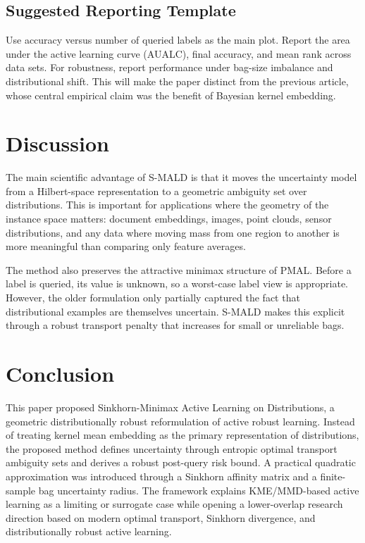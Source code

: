 \documentclass[11pt,a4paper]{article}
\begin{document}
\subsection{Suggested Reporting Template}

Use accuracy versus number of queried labels as the main plot. Report the area under the active learning curve (AUALC), final accuracy, and mean rank across data sets. For robustness, report performance under bag-size imbalance and distributional shift. This will make the paper distinct from the previous article, whose central empirical claim was the benefit of Bayesian kernel embedding.

\section{Discussion}

The main scientific advantage of S-MALD is that it moves the uncertainty model from a Hilbert-space representation to a geometric ambiguity set over distributions. This is important for applications where the geometry of the instance space matters: document embeddings, images, point clouds, sensor distributions, and any data where moving mass from one region to another is more meaningful than comparing only feature averages.

The method also preserves the attractive minimax structure of PMAL. Before a label is queried, its value is unknown, so a worst-case label view is appropriate. However, the older formulation only partially captured the fact that distributional examples are themselves uncertain. S-MALD makes this explicit through a robust transport penalty that increases for small or unreliable bags.

\section{Conclusion}

This paper proposed Sinkhorn-Minimax Active Learning on Distributions, a geometric distributionally robust reformulation of active robust learning. Instead of treating kernel mean embedding as the primary representation of distributions, the proposed method defines uncertainty through entropic optimal transport ambiguity sets and derives a robust post-query risk bound. A practical quadratic approximation was introduced through a Sinkhorn affinity matrix and a finite-sample bag uncertainty radius. The framework explains KME/MMD-based active learning as a limiting or surrogate case while opening a lower-overlap research direction based on modern optimal transport, Sinkhorn divergence, and distributionally robust active learning.
\end{document}
